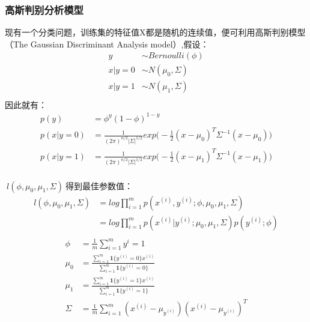 \subsubsection{高斯判别分析模型}
现有一个分类问题，训练集的特征值X都是随机的连续值，便可利用高斯判别模型（The Gaussian Discriminant Analysis model）,假设：
\begin{equation}\nonumber
\begin{split}
  y &\sim Bernoulli(\phi)\\
  x|y=0 &\sim N(\mu_0,\Sigma)\\
  x|y=1 &\sim N(\mu_1,\Sigma)\\
\end{split}
\end{equation}
因此就有：
\begin{equation}\nonumber
\begin{split}
  p(y)&=\phi^y(1-\phi)^{1-y}\\
  p(x|y=0)&=\frac{1}{(2\pi)^{n/2}|\Sigma|^{1/2}}exp\bigg(-\frac{1}{2}(x-\mu_0)^T\Sigma^{-1}(x-\mu_0)\bigg)\\
  p(x|y=1)&=\frac{1}{(2\pi)^{n/2}|\Sigma|^{1/2}}exp\bigg(-\frac{1}{2}(x-\mu_1)^T\Sigma^{-1}(x-\mu_1)\bigg)\\
\end{split}
\end{equation}


$~l(\phi,\mu_0,\mu_1,\Sigma)~$得到最佳参数值：
\begin{equation}\nonumber
\begin{split}
  l(\phi,\mu_0,\mu_1,\Sigma)&=log\prod_{i=1}^{m}p(x^{(i)},y^{(i)};\phi,\mu_0,\mu_1,\Sigma)\\
  &=log\prod_{i=1}^{m}p(x^{(i)}|y^{(i)};\mu_0,\mu_1,\Sigma)p(y^{(i)};\phi)\\
\end{split}
\end{equation}
\begin{equation}\nonumber
\begin{split}
  \phi~&=\frac{1}{m}\sum_{i=1}^{m}{y^{i}=1}\\
  \mu_0&=\frac{\sum_{i=1}^{m}\textbf{1}\{y^{(i)}=0\}x^{(i)}}{\sum_{i=1}^{m}\textbf{1}\{y^{(i)}=0\}}\\
  \mu_1&=\frac{\sum_{i=1}^{m}\textbf{1}\{y^{(i)}=1\}x^{(i)}}{\sum_{i=1}^{m}\textbf{1}\{y^{(i)}=1\}}\\
  \Sigma&=\frac{1}{m}\sum_{i=1}^{m}(x^{(i)}-\mu_{y^{(i)}})(x^{(i)}-\mu_{y^{(i)}})^T\\
\end{split}
\end{equation}

